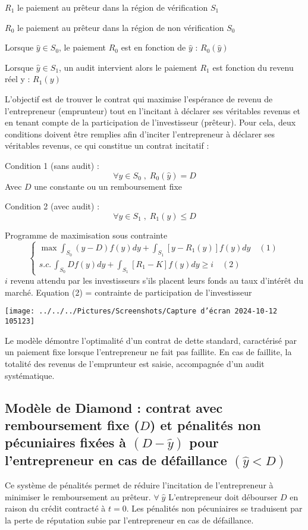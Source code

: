 \documentclass[a4paper, 12pt]{report}
\begin{document}
$R_1$ le paiement au prêteur dans la région de vérification $S_1$

$R_0$ le paiement au prêteur dans la région de non vérification $S_0$

Lorsque $\widehat{y}\in S_0$, le paiement $R_0$ est en fonction de $\widehat{y}$ : $R_0(\widehat{y})$

Lorsque $\widehat{y}\in S_1$, un audit intervient alors le paiement $R_1$ est fonction du revenu réel y : $R_1(y)$

L'objectif est de trouver le contrat qui maximise l’espérance de revenu de l’entrepreneur (emprunteur) tout en l'incitant à déclarer ses véritables revenus et en tenant compte de la participation de l’investisseur (prêteur). Pour cela, deux conditions doivent être remplies afin d'inciter l'entrepreneur à déclarer ses véritables revenus, ce qui constitue un contrat incitatif : 

Condition 1 (sans audit) :
$$
\forall y \in S_0\;,\; R_0(\widehat{y})=D
$$
Avec $D$ une constante ou un remboursement fixe

Condition 2 (avec audit) :
$$
\forall y \in S_1\;,\; R_1(y)\le D
$$

Programme de maximisation sous contrainte
$$
\begin{cases}\max \int_{S_0}(y-D)f(y)dy+\int_{S_1}[y-R_1(y)]f(y)dy\quad(1)\\s.c. \, \int_{S_0}Df(y)dy+\int_{S_1}[R_1-K]f(y)dy\ge i\quad(2)\end{cases}
$$
$i$ revenu attendu par les investisseurs s’ils placent leurs fonds au taux d’intérêt du marché. Equation (2) = contrainte de participation de l’investisseur
\begin{center}
	\texttt{[image: ../../../Pictures/Screenshots/Capture d'écran 2024-10-12 105123]}
\end{center}
Le modèle démontre l'optimalité d'un contrat de dette standard, caractérisé par un paiement fixe lorsque l’entrepreneur ne fait pas faillite. En cas de faillite, la totalité des revenus de l'emprunteur est saisie, accompagnée d'un audit systématique.

\subsection{Modèle de Diamond : contrat avec remboursement fixe ($D$) et pénalités non pécuniaires fixées à $(D-\widehat{y})$ pour l’entrepreneur en cas de défaillance $(\widehat{y}<D)$}

Ce système de pénalités permet de réduire l'incitation de l'entrepreneur à minimiser le remboursement au prêteur. $\forall\;\widehat{y}$ L'entrepreneur doit débourser $D$ en raison du crédit contracté à $t=0$. Les pénalités non pécuniaires se traduisent par la perte de réputation subie par l'entrepreneur en cas de défaillance.
\end{document}
